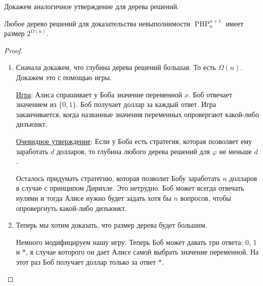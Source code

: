 Докажем аналогичное утверждение для дерева решений. 
\begin{theorem}
    Любое дерево решений для доказательства невыполнимости $\operatorname{PHP}^{n+1}_n$ имеет размер $2^{\Omega (n)}$.
\end{theorem}
\begin{proof} \quad 

    \begin{enumerate}
        \item Сначала докажем, что глубина дерева решений большая. То есть $\Omega (n)$. 
        Докажем это с помощью игры.

        \underline{Игра}: Алиса спрашивает у Боба значение переменной $x$. Боб отвечает значением из $\{0, 1\}$. Боб получает доллар 
        за каждый ответ. Игра заканчивается, когда названные значения переменных опровергают какой-либо дизъюнкт.
        
        \underline{Очевидное утверждение}: Если у Боба есть стратегия, которая позволяет ему заработать $d$ долларов, то глубина любого дерева решений для $\varphi$ не меньше $d$. 

        Осталось придумать стратегию, которая позволит Бобу заработать $n$ долларов в случае с принципом Дирихле. Это нетрудно. Боб может всегда отвечать нулями и тогда Алисе нужно будет 
        задать хотя бы $n$ вопросов, чтобы опровергнуть какой-либо дизъюнкт. 
        \item Теперь мы хотим доказать, что размер дерева будет большим.
        
        Немного модифицируем нашу игру. Теперь Боб может давать три ответа: $0$, $1$ и $*$, в случае которого он дает Алисе самой выбрать значение переменной.
        На этот раз Боб получает доллар только за ответ $*$. 


\end{enumerate}
\end{proof}
